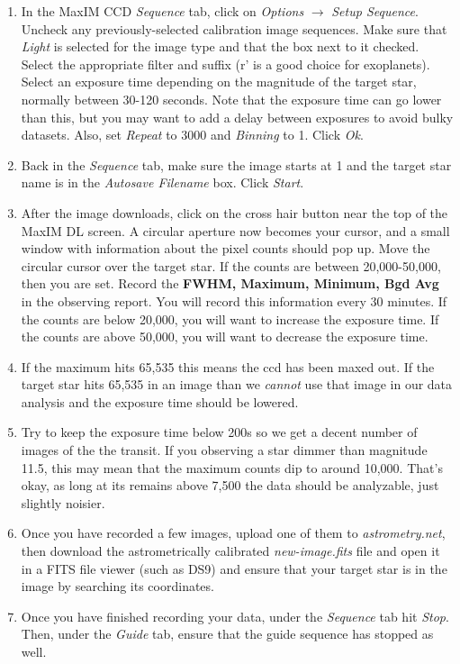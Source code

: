 \documentclass[11pt]{report}
\begin{document}
\begin{enumerate}
\item In the MaxIM CCD \emph{Sequence} tab, click on \emph{Options} {$\rightarrow$} \emph{Setup Sequence}. Uncheck any previously-selected calibration image sequences. Make sure that \emph{Light} is selected for the image type and that the box next to it checked. Select the appropriate filter and suffix (r' is a good choice for exoplanets). Select an exposure time depending on the magnitude of the target star, normally between 30-120 seconds. Note that the exposure time can go lower than this, but you may want to add a delay between exposures to avoid bulky datasets. Also, set \emph{Repeat} to 3000 and \emph{Binning} to 1. Click \emph{Ok}.
\item Back in the \emph{Sequence} tab, make sure the image starts at 1 and the target star name is in the \emph{Autosave Filename} box. Click \emph{Start}.
\item After the image downloads, click on the cross hair button near the top of the MaxIM DL screen. A circular aperture now becomes your cursor, and a small window with information about the pixel counts should pop up. Move the circular cursor over the target star. If the counts are between 20,000-50,000, then you are set. Record the {\bf FWHM, Maximum, Minimum, Bgd Avg} in the observing report. You will record this information every 30 minutes. If the counts are below 20,000, you will want to increase the exposure time. If the counts are above 50,000, you will want to decrease the exposure time. 
\item If the maximum hits 65,535 this means the ccd has been maxed out. If the target star hits 65,535 in an image than we \emph{cannot} use that image in our data analysis and the exposure time should be lowered.
\item Try to keep the exposure time below 200s so we get a decent number of images of the the transit. If you observing a star dimmer than magnitude 11.5, this may mean that the maximum counts dip to around 10,000. That's okay, as long at its remains above 7,500 the data should be analyzable, just slightly noisier.
\item Once you have recorded a few images, upload one of them to \emph{astrometry.net}, then download the astrometrically calibrated \emph{new-image.fits} file and open it in a FITS file viewer (such as DS9) and ensure that your target star is in the image by searching its coordinates.
\item Once you have finished recording your data, under the \emph{Sequence} tab hit \emph{Stop}. Then, under the \emph{Guide} tab, ensure that the guide sequence has stopped as well.
\end{enumerate}
\end{document}
